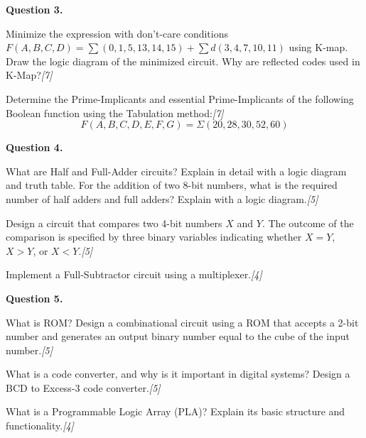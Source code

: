 \documentclass[11pt,a4paper]{article}
\newcommand{\pts}[1]{\hfill   \textit{[#1]}}
\begin{document}
\bigskip



\noindent   \textbf{Question 3.}

\begin{parts}
  \item Minimize the expression with don't-care conditions $F(A,B,C,D) = \sum(0,1,5,13,14,15) + \sum d(3,4,7,10,11)$ using K-map. Draw the logic diagram of the minimized circuit. Why are reflected codes used in K-Map?\pts{7}
  \item Determine the Prime-Implicants and essential Prime-Implicants of the following Boolean function using the Tabulation method:\pts{7}
    \[F(A,B,C,D,E,F,G) = \Sigma(20,28,30,52,60)\]
\end{parts}

\bigskip



\noindent   \textbf{Question 4.}

\begin{parts}
  \item What are Half and Full-Adder circuits? Explain in detail with a logic diagram and truth table. For the addition of two 8-bit numbers, what is the required number of half adders and full adders? Explain with a logic diagram.\pts{5}
  \item Design a circuit that compares two 4-bit numbers $X$ and $Y$. The outcome of the comparison is specified by three binary variables indicating whether $X=Y$, $X>Y$, or $X<Y$.\pts{5}
  \item Implement a Full-Subtractor circuit using a multiplexer.\pts{4}
\end{parts}

\bigskip



\noindent   \textbf{Question 5.}

\begin{parts}
  \item What is ROM? Design a combinational circuit using a ROM that accepts a 2-bit number and generates an output binary number equal to the cube of the input number.\pts{5}
  \item What is a code converter, and why is it important in digital systems? Design a BCD to Excess-3 code converter.\pts{5}
  \item What is a Programmable Logic Array (PLA)? Explain its basic structure and functionality.\pts{4}
\end{parts}

\bigskip
\end{document}
